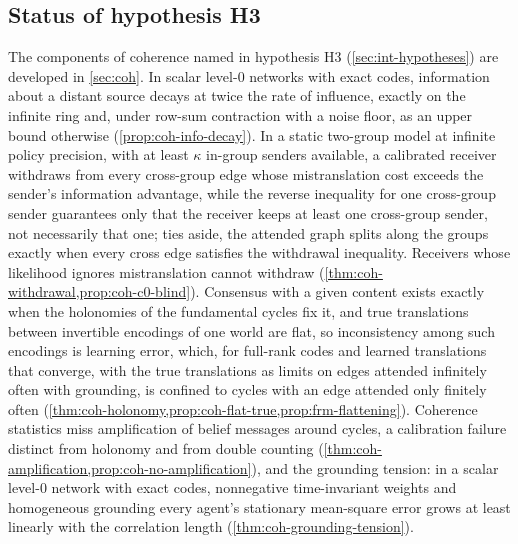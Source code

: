 \subsection{Status of hypothesis H3}\label{sup:int-status-of-hypothesis-h3}

The components of coherence named in hypothesis H3 (\cref{sec:int-hypotheses}) are developed in \cref{sec:coh}. In scalar level-0 networks with exact codes, information about a distant source decays at twice the rate of influence, exactly on the infinite ring and, under row-sum contraction with a noise floor, as an upper bound otherwise (\cref{prop:coh-info-decay}). In a static two-group model at infinite policy precision, with at least $\kappa$ in-group senders available, a calibrated receiver withdraws from every cross-group edge whose mistranslation cost exceeds the sender's information advantage, while the reverse inequality for one cross-group sender guarantees only that the receiver keeps at least one cross-group sender, not necessarily that one; ties aside, the attended graph splits along the groups exactly when every cross edge satisfies the withdrawal inequality. Receivers whose likelihood ignores mistranslation cannot withdraw (\cref{thm:coh-withdrawal,prop:coh-c0-blind}). Consensus with a given content exists exactly when the holonomies of the fundamental cycles fix it, and true translations between invertible encodings of one world are flat, so inconsistency among such encodings is learning error, which, for full-rank codes and learned translations that converge, with the true translations as limits on edges attended infinitely often with grounding, is confined to cycles with an edge attended only finitely often (\cref{thm:coh-holonomy,prop:coh-flat-true,prop:frm-flattening}). Coherence statistics miss amplification of belief messages around cycles, a calibration failure distinct from holonomy and from double counting (\cref{thm:coh-amplification,prop:coh-no-amplification}), and the grounding tension: in a scalar level-0 network with exact codes, nonnegative time-invariant weights and homogeneous grounding every agent's stationary mean-square error grows at least linearly with the correlation length (\cref{thm:coh-grounding-tension}).

